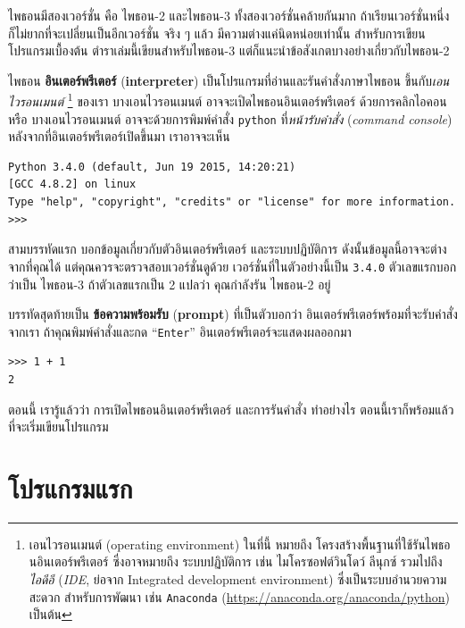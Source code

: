 ไพธอนมีสองเวอร์ชั่น คือ ไพธอน-2 และไพธอน-3
ทั้งสองเวอร์ชั่นคล้ายกันมาก ถ้าเรียนเวอร์ชั่นหนึ่ง ก็ไม่ยากที่จะเปลี่ยนเป็นอีกเวอร์ชั่น
จริง ๆ แล้ว มีความต่างแค่นิดหน่อยเท่านั้น สำหรับการเขียนโปรแกรมเบื้องต้น
ตำราเล่มนี้เขียนสำหรับไพธอน-3 แต่ก็แนะนำข้อสังเกตบางอย่างเกี่ยวกับไพธอน-2

ไพธอน \textbf{อินเตอร์พรีเตอร์} (\textbf{interpreter}) เป็นโปรแกรมที่อ่านและรันคำสั่งภาษาไพธอน
ขึ้นกับ\textit{เอนไวรอนเมนต์}%
\footnote{เอนไวรอนเมนต์ (operating environment) ในที่นี้ หมายถึง โครงสร้างพื้นฐานที่ใช้รันไพธอนอินเตอร์พรีเตอร์
ซึ่งอาจหมายถึง 
ระบบปฏิบัติการ เช่น ไมโครซอฟต์วินโดว์ ลีนุกซ์ รวมไปถึง \textit{ไอดีอี} (\textit{IDE}, ย่อจาก Integrated development environment) ซึ่งเป็นระบบอำนวยความสะดวก สำหรับการพัฒนา เช่น \texttt{Anaconda} (\url{https://anaconda.org/anaconda/python}) เป็นต้น}
ของเรา บางเอนไวรอนเมนต์ อาจจะเปิดไพธอนอินเตอร์พรีเตอร์
ด้วยการคลิกไอคอน
หรือ บางเอนไวรอนเมนต์ อาจจะด้วยการพิมพ์คำสั่ง \texttt{python} ที่\textit{หน้ารับคำสั่ง} (\textit{command console})
หลังจากที่อินเตอร์พรีเตอร์เปิดขึ้นมา เราอาจจะเห็น

\begin{Verbatim}[fontsize=\small]
Python 3.4.0 (default, Jun 19 2015, 14:20:21) 
[GCC 4.8.2] on linux
Type "help", "copyright", "credits" or "license" for more information.
>>> 
\end{Verbatim}

สามบรรทัดแรก บอกข้อมูลเกี่ยวกับตัวอินเตอร์พรีเตอร์ และระบบปฏิบัติการ
ดังนั้นข้อมูลนี้อาจจะต่างจากที่คุณได้
แต่คุณควรจะตรวจสอบเวอร์ชั่นดูด้วย
เวอร์ชั่นที่ในตัวอย่างนี้เป็น \texttt{3.4.0} ตัวเลขแรกบอกว่าเป็น ไพธอน-3
ถ้าตัวเลขแรกเป็น 2 แปลว่า คุณกำลังรัน ไพธอน-2 อยู่

บรรทัดสุดท้ายเป็น \textbf{ข้อความพร้อมรับ} (\textbf{prompt}) ที่เป็นตัวบอกว่า อินเตอร์พรีเตอร์พร้อมที่จะรับคำสั่งจากเรา
ถ้าคุณพิมพ์คำสั่งและกด ``\texttt{Enter}'' อินเตอร์พรีเตอร์จะแสดงผลออกมา

\begin{verbatim}
>>> 1 + 1
2
\end{verbatim}
%
ตอนนี้ เรารู้แล้วว่า การเปิดไพธอนอินเตอร์พรีเตอร์ และการรันคำสั่ง ทำอย่างไร
ตอนนี้เราก็พร้อมแล้วที่จะเริ่มเขียนโปรแกรม

\section{โปรแกรมแรก}
\label{hello}

